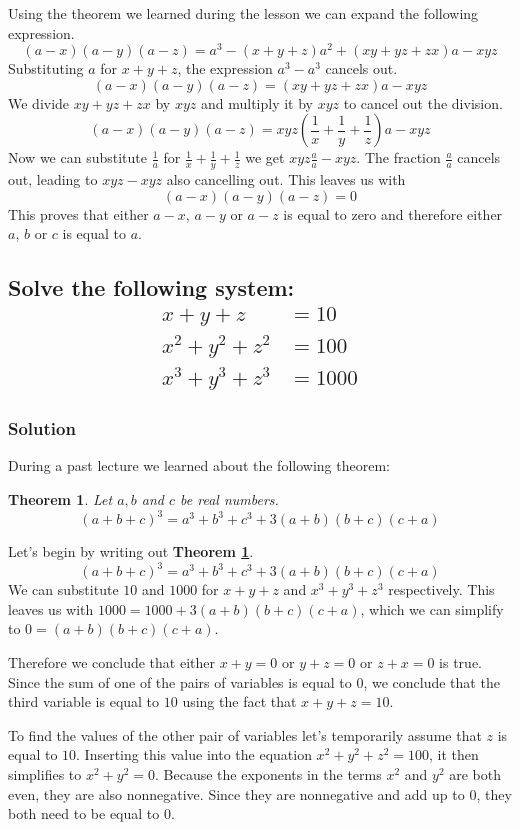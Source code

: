 \documentclass{article}
\newcommand{\solution}{\subsubsection*{\textcolor{MainColor}{Solution}}}
\newcounter{theoremcounter}
\theoremstyle{maintheorem}
\newtheorem{theorem}[theoremcounter]{\textcolor{SubColor}{Theorem}}
\newcommand{\thmref}[1]{\textcolor{SubSubColor}{\textbf{Theorem \ref{#1}}}}
\begin{document}
Using the theorem we learned during the lesson we can expand the following expression.
\[(a-x)(a-y)(a-z) = a^3 - (x + y + z)a^2 + (xy + yz + zx)a - xyz\]
Substituting $a$ for $ x + y + z $, the expression $a^3 - a^3$ cancels out.
\[(a-x)(a-y)(a-z) = (xy + yz + zx)a - xyz\]
We divide $xy + yz + zx$ by $xyz$ and multiply it by $xyz$ to cancel out the division.
\[(a-x)(a-y)(a-z) = xyz\left(\frac{1}{x} + \frac{1}{y} + \frac{1}{z}\right)a - xyz\]
Now we can substitute $ \frac{1}{a} $ for $ \frac{1}{x} + \frac{1}{y} + \frac{1}{z} $ we get $ xyz\frac{a}{a} - xyz $. The fraction $ \frac{a}{a} $ cancels out, leading to $xyz - xyz$ also cancelling out.
This leaves us with
\[(a-x)(a-y)(a-z) = 0\]
This proves that either $a - x$, $a - y$ or $a - z$ is equal to zero and therefore either $a$, $b$ or $c$ is equal to $a$.

\subsection{
    \normalfont
    Solve the following system:
    \begin{align*}
        x + y + z       & = 10   \\
        x^2 + y^2 + z^2 & = 100  \\
        x^3 + y^3 + z^3 & = 1000
    \end{align*}
}

\solution

During a past lecture we learned about the following theorem:
\begin{theorem}\label{thm2}
    Let $a, b$ and $c$ be real numbers.
    \[ (a + b + c)^3 = a^3 + b^3 + c^3 + 3(a + b)(b + c)(c + a) \]
\end{theorem}

Let's begin by writing out \thmref{thm2}.
\[ (a + b + c)^3 = a^3 + b^3 + c^3 + 3(a + b)(b + c)(c + a) \]
We can substitute $10$ and $1000$ for $x + y + z$ and $x^3 + y^3 + z^3$ respectively. This leaves us with $1000 = 1000 + 3(a + b)(b + c)(c + a)$,
which we can simplify to $0 = (a + b)(b + c)(c + a)$.

Therefore we conclude that either $x + y = 0$ or $y + z = 0$ or $z + x = 0$ is true.
Since the sum of one of the pairs of variables is equal to $0$, we conclude that the third variable is equal to $10$ using the fact that $x + y + z = 10$.

To find the values of the other pair of variables let's temporarily assume that $z$ is equal to $10$. Inserting this value into the equation $x^2 + y^2 + z^2 = 100$, it then simplifies to $x^2 + y^2 = 0$.
Because the exponents in the terms $x^2$ and $y^2$ are both even, they are also nonnegative. Since they are nonnegative and add up to $0$, they both need to be equal to $0$.
\end{document}
